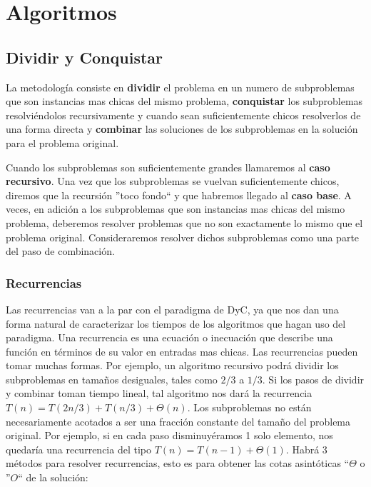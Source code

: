 \chapter{Algoritmos}

\newpage
\section{Dividir y Conquistar}

La metodolog\'ia consiste en \textbf{dividir} el problema en un numero de subproblemas que son instancias mas chicas del mismo problema, \textbf{conquistar} los subproblemas resolvi\'endolos recursivamente y cuando sean suficientemente chicos resolverlos de una forma directa y \textbf{combinar} las soluciones de los subproblemas en la soluci\'on para el problema original.

Cuando los subproblemas son suficientemente grandes llamaremos al \textbf{caso recursivo}. Una vez que los subproblemas se vuelvan suficientemente chicos, diremos que la recursi\'on ''toco fondo`` y que habremos llegado al \textbf{caso base}. A veces, en adici\'on a los subproblemas que son instancias mas chicas del mismo problema, deberemos resolver problemas que no son exactamente lo mismo que el problema original. Consideraremos resolver dichos subproblemas como una parte del paso de combinaci\'on.

\subsection{Recurrencias}

Las recurrencias van a la par con el paradigma de DyC, ya que nos dan una forma natural de caracterizar los tiempos de los algoritmos que hagan uso del paradigma. Una recurrencia es una ecuaci\'on o inecuaci\'on que describe una funci\'on en t\'erminos de su valor en entradas mas chicas. Las recurrencias pueden tomar muchas formas. Por ejemplo, un algoritmo recursivo podr\'a dividir los subproblemas en tama\~nos desiguales, tales como $2/3$ a $1/3$. Si los pasos de dividir y combinar toman tiempo lineal, tal algoritmo nos dar\'a la recurrencia $T(n) = T(2n/3) + T(n/3) + \Theta(n)$. Los subproblemas no están necesariamente acotados a ser una fracci\'on constante del tama\~no del problema original. Por ejemplo, si en cada paso disminuy\'eramos 1 solo elemento, nos quedar\'ia una recurrencia del tipo $T(n) = T(n-1) + \Theta(1)$. Habr\'a 3 m\'etodos para resolver recurrencias, esto es para obtener las cotas asint\'oticas ``$\Theta$ o ''$O$`` de la soluci\'on:

